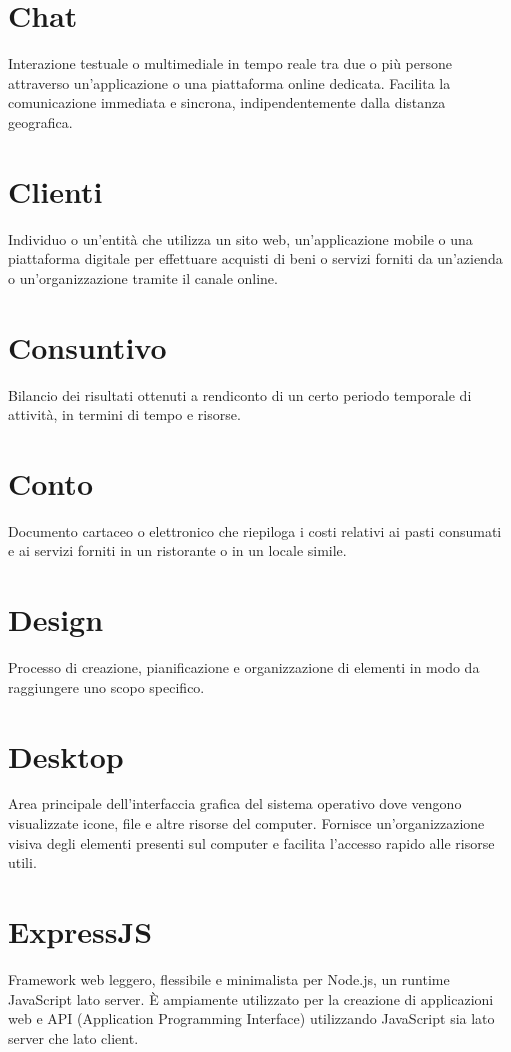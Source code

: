 \section{Chat}
Interazione testuale o multimediale in tempo reale tra due o più persone attraverso un'applicazione o una piattaforma online dedicata. Facilita la comunicazione immediata e sincrona, indipendentemente dalla distanza geografica.

\section{Clienti}
Individuo o un'entità che utilizza un sito web, un'applicazione mobile o una piattaforma digitale per effettuare acquisti di beni o servizi forniti da un'azienda o un'organizzazione tramite il canale online.

\section{Consuntivo}
Bilancio dei risultati ottenuti a rendiconto di un certo periodo temporale di attività, in termini di tempo e risorse.

\section{Conto}
Documento cartaceo o elettronico che riepiloga i costi relativi ai pasti consumati e ai servizi forniti in un ristorante o in un locale simile.

\section{Design}
Processo di creazione, pianificazione e organizzazione di elementi in modo da raggiungere uno scopo specifico.

\section{Desktop}
Area principale dell'interfaccia grafica del sistema operativo dove vengono visualizzate icone, file e altre risorse del computer. Fornisce un'organizzazione visiva degli elementi presenti sul computer e facilita l'accesso rapido alle risorse utili.

\section{ExpressJS}
Framework web leggero, flessibile e minimalista per Node.js, un runtime JavaScript lato server. È ampiamente utilizzato per la creazione di applicazioni web e API (Application Programming Interface) utilizzando JavaScript sia lato server che lato client.

